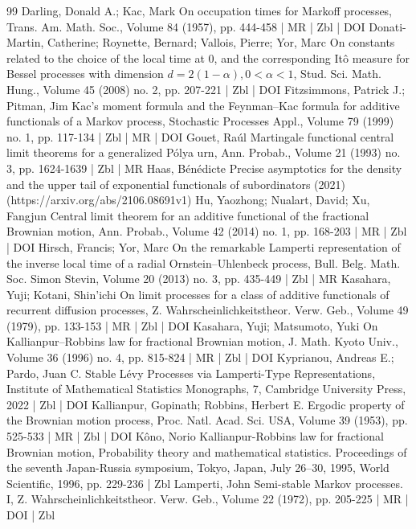 \begin{thebibliography}{99}
Darling, Donald A.; Kac, Mark On occupation times for Markoff processes, Trans. Am. Math. Soc., Volume 84 (1957), pp. 444-458 | MR | Zbl | DOI
Donati-Martin, Catherine; Roynette, Bernard; Vallois, Pierre; Yor, Marc On constants related to the choice of the local time at $0$, and the corresponding Itô measure for Bessel processes with dimension $d=2(1-\alpha ),0<\alpha <1$, Stud. Sci. Math. Hung., Volume 45 (2008) no. 2, pp. 207-221 | Zbl | DOI
Fitzsimmons, Patrick J.; Pitman, Jim Kac’s moment formula and the Feynman–Kac formula for additive functionals of a Markov process, Stochastic Processes Appl., Volume 79 (1999) no. 1, pp. 117-134 | Zbl | MR | DOI
Gouet, Raúl Martingale functional central limit theorems for a generalized Pólya urn, Ann. Probab., Volume 21 (1993) no. 3, pp. 1624-1639 | Zbl | MR
Haas, Bénédicte Precise asymptotics for the density and the upper tail of exponential functionals of subordinators (2021) (https://arxiv.org/abs/2106.08691v1)
Hu, Yaozhong; Nualart, David; Xu, Fangjun Central limit theorem for an additive functional of the fractional Brownian motion, Ann. Probab., Volume 42 (2014) no. 1, pp. 168-203 | MR | Zbl | DOI
Hirsch, Francis; Yor, Marc On the remarkable Lamperti representation of the inverse local time of a radial Ornstein–Uhlenbeck process, Bull. Belg. Math. Soc. Simon Stevin, Volume 20 (2013) no. 3, pp. 435-449 | Zbl | MR
Kasahara, Yuji; Kotani, Shin’ichi On limit processes for a class of additive functionals of recurrent diffusion processes, Z. Wahrscheinlichkeitstheor. Verw. Geb., Volume 49 (1979), pp. 133-153 | MR | Zbl | DOI
Kasahara, Yuji; Matsumoto, Yuki On Kallianpur–Robbins law for fractional Brownian motion, J. Math. Kyoto Univ., Volume 36 (1996) no. 4, pp. 815-824 | MR | Zbl | DOI
Kyprianou, Andreas E.; Pardo, Juan C. Stable Lévy Processes via Lamperti-Type Representations, Institute of Mathematical Statistics Monographs, 7, Cambridge University Press, 2022 | Zbl | DOI
Kallianpur, Gopinath; Robbins, Herbert E. Ergodic property of the Brownian motion process, Proc. Natl. Acad. Sci. USA, Volume 39 (1953), pp. 525-533 | MR | Zbl | DOI
Kôno, Norio Kallianpur-Robbins law for fractional Brownian motion, Probability theory and mathematical statistics. Proceedings of the seventh Japan-Russia symposium, Tokyo, Japan, July 26–30, 1995, World Scientific, 1996, pp. 229-236 | Zbl
Lamperti, John Semi-stable Markov processes. I, Z. Wahrscheinlichkeitstheor. Verw. Geb., Volume 22 (1972), pp. 205-225 | MR | DOI | Zbl

\end{thebibliography}
